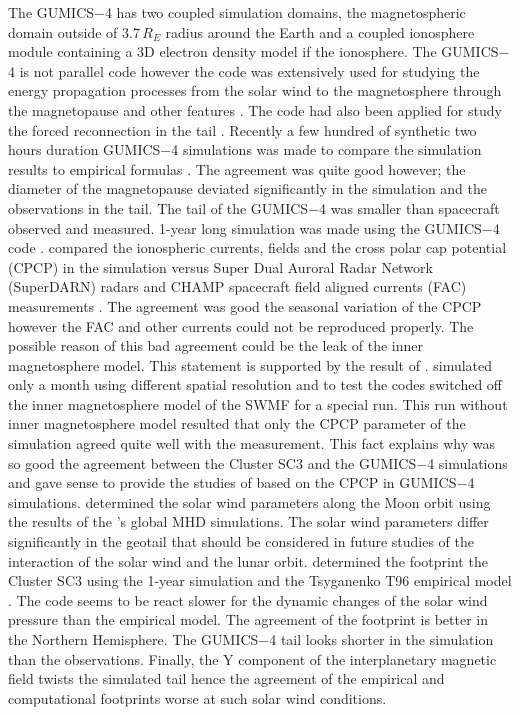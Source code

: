 \documentclass[linenumbers,draft]{agujournal}
\begin{document}
The GUMICS$-$4 has two coupled simulation domains, the magnetospheric domain outside of 3.7\,$R_E$ radius around the Earth and a coupled ionosphere module containing a 3D electron density model if the ionosphere. The GUMICS$-$4 is not parallel code however the code was extensively used for studying the energy propagation processes from the solar wind to the magnetosphere through the magnetopause and other features \citep[][see the references therein]{janhunen12:_gumic_mhd}. The code had also been applied for study the forced reconnection in the tail \citep{voeroes14:_winds_condit_ram_co_ram}. Recently a few hundred of synthetic two hours duration GUMICS$-$4 simulations was made to compare the simulation results to empirical formulas \citep{gordeev13:_verif_gumic_mhd}. The agreement was quite good however; the diameter of the magnetopause deviated significantly in the simulation and the observations in the tail. The tail of the GUMICS$-$4 was smaller than spacecraft observed and measured. 1-year long simulation was made using the GUMICS$-$4 code \citep{facsko16:_one_earth}. \citet{juusola14:_statis_gumic_mhd} compared the ionospheric currents, fields and the cross polar cap potential (CPCP) in the simulation versus Super Dual Auroral Radar Network (SuperDARN) radars \citep{greenwald95:_darn_super} and CHAMP spacecraft \citep{reigber02:_champ} field aligned currents (FAC) measurements \citep{juusola07:_hall_peder_champ,ritter04:_ionos_champ_image}. The agreement was good the seasonal variation of the CPCP however the FAC and other currents could not be reproduced properly. The possible reason of this bad agreement could be the leak of the inner magnetosphere model. This statement is supported by the result of \citet{haiducek17:_swmf_global_magnet_simul_januar}. \citeauthor{haiducek17:_swmf_global_magnet_simul_januar} simulated only a month using different spatial resolution and to test the codes switched off the inner magnetosphere model of the SWMF for a special run.  This run without inner magnetosphere model resulted that only the CPCP parameter of the simulation agreed quite well with the measurement. This fact explains why was so good the agreement between the Cluster SC3 and the GUMICS$-$4 simulations and gave sense to provide the studies of \citet{lakka18:_cross_polar_cap_satur_gumic,lakka18:_icme_earth_mach} based on the CPCP in GUMICS$-$4 simulations. \citet{kallio15:_proper} determined the solar wind parameters along the Moon orbit using the results of the \citet{facsko16:_one_earth}'s global MHD simulations. The solar wind parameters differ significantly in the geotail that should be considered in future studies of the interaction of the solar wind and the lunar orbit. \citet{facsko16:_one_earth} determined the footprint the Cluster SC3 using the 1-year simulation and the Tsyganenko T96 empirical model \citep{tsyganenko95:_model_earth}. The code seems to be react slower for the dynamic changes of the solar wind pressure than the empirical model. The agreement of the footprint is better in the Northern Hemisphere. The GUMICS$-$4 tail looks shorter in the simulation than the observations. Finally, the Y component of the interplanetary magnetic field twists the simulated tail hence the agreement of the empirical and computational footprints worse at such solar wind conditions.
\end{document}

